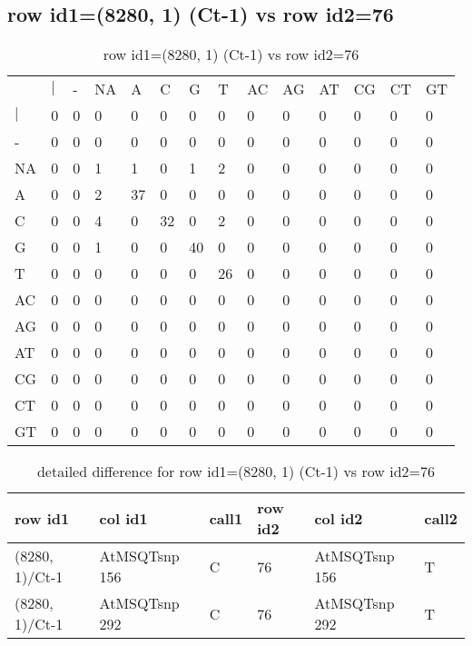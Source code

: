 \subsection{row id1=(8280, 1) (Ct-1) vs row id2=76}
\begin{center}
\begin{longtable}{|l|l|l|l|l|l|l|l|l|l|l|l|l|l|}
\caption{row id1=(8280, 1) (Ct-1) vs row id2=76} \label{table_dm242}\\
\hline
\\
\hline
&$|$&-&NA&A&C&G&T&AC&AG&AT&CG&CT&GT\\
$|$&0&0&0&0&0&0&0&0&0&0&0&0&0\\
-&0&0&0&0&0&0&0&0&0&0&0&0&0\\
NA&0&0&1&1&0&1&2&0&0&0&0&0&0\\
A&0&0&2&37&0&0&0&0&0&0&0&0&0\\
C&0&0&4&0&32&0&2&0&0&0&0&0&0\\
G&0&0&1&0&0&40&0&0&0&0&0&0&0\\
T&0&0&0&0&0&0&26&0&0&0&0&0&0\\
AC&0&0&0&0&0&0&0&0&0&0&0&0&0\\
AG&0&0&0&0&0&0&0&0&0&0&0&0&0\\
AT&0&0&0&0&0&0&0&0&0&0&0&0&0\\
CG&0&0&0&0&0&0&0&0&0&0&0&0&0\\
CT&0&0&0&0&0&0&0&0&0&0&0&0&0\\
GT&0&0&0&0&0&0&0&0&0&0&0&0&0\\
\hline
\end{longtable}
\end{center}

\begin{center}
\begin{longtable}{|l|l|l|l|l|l|}
\caption{detailed difference for row id1=(8280, 1) (Ct-1) vs row id2=76} \label{table_dm243}\\
\hline
row id1&col id1&call1&row id2&col id2&call2\\
\hline
(8280, 1)/Ct-1&AtMSQTsnp 156&C&76&AtMSQTsnp 156&T\\
(8280, 1)/Ct-1&AtMSQTsnp 292&C&76&AtMSQTsnp 292&T\\
\hline
\end{longtable}
\end{center}

